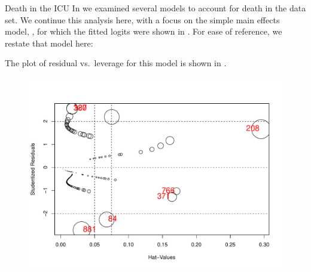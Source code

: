 \documentclass[11pt]{book}
\renewenvironment{knitrout}{\small\renewcommand{\baselinestretch}{.85}}{} %
\begin{document}
\begin{Example}[icu2]{Death in the ICU}
In  we examined several models to account for death in the 
 data set. We continue this analysis here, with a focus on
the simple main effects model, , for which the fitted
logits were shown in .
For ease of reference, we restate that model here:
\begin{knitrout}
\color{fgcolor}\begin{kframe}
\begin{alltt}
 \hlkwb{<-}  \hlopt{~}  \hlopt{+}   \hlopt{+}  \hlopt{+} 
                 
\end{alltt}
\end{kframe}
\end{knitrout}

The plot of residual vs.\  leverage for this model is shown in .
\begin{knitrout}
\color{fgcolor}\begin{kframe}
\begin{alltt}
 \hlkwb{<-}  \hlstd{=}\hlstd{,} \hlstd{=}\hlstd{,} \hlstd{=}\hlstd{,} \hlstd{=}\hlstd{)}
\end{alltt}
\end{kframe}\begin{figure}[!htbp]


\centerline{\includegraphics[width=.7\textwidth]{ch07/fig/icu2-inflplot} }


\end{figure}
\end{knitrout}
\end{Example}
\end{document}
